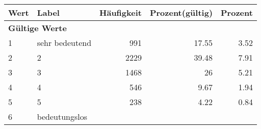      \begin{longtable}{lXrrr}
     \toprule
     \textbf{Wert} & \textbf{Label} & \textbf{Häufigkeit} & \textbf{Prozent(gültig)} & \textbf{Prozent} \\
     \endhead
     \midrule
     \multicolumn{5}{l}{\textbf{Gültige Werte}}\\

     1 &
     \multicolumn{1}{X}{ sehr bedeutend   } &


       \num{991} &
       \num[round-mode=places,round-precision=2]{17,55} &
         \num[round-mode=places,round-precision=2]{3,52} \\

     2 &
     \multicolumn{1}{X}{ 2   } &


       \num{2229} &
       \num[round-mode=places,round-precision=2]{39,48} &
         \num[round-mode=places,round-precision=2]{7,91} \\

     3 &
     \multicolumn{1}{X}{ 3   } &


       \num{1468} &
       \num[round-mode=places,round-precision=2]{26} &
         \num[round-mode=places,round-precision=2]{5,21} \\

     4 &
     \multicolumn{1}{X}{ 4   } &


       \num{546} &
       \num[round-mode=places,round-precision=2]{9,67} &
         \num[round-mode=places,round-precision=2]{1,94} \\

     5 &
     \multicolumn{1}{X}{ 5   } &


       \num{238} &
       \num[round-mode=places,round-precision=2]{4,22} &
         \num[round-mode=places,round-precision=2]{0,84} \\

     6 &
     \multicolumn{1}{X}{ bedeutungslos   } &



\end{longtable}
